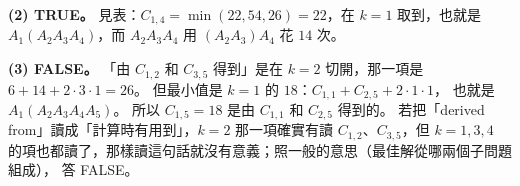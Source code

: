 \begin{pastsoln}
\textbf{(2) TRUE。} 見表：$C_{1,4} = \min(22, 54, 26) = 22$，在 $k = 1$ 取到，也就是
$A_1 (A_2 A_3 A_4)$，而 $A_2 A_3 A_4$ 用 $(A_2 A_3) A_4$ 花 $14$ 次。

\textbf{(3) FALSE。} 「由 $C_{1,2}$ 和 $C_{3,5}$ 得到」是在 $k = 2$ 切開，那一項是
$6 + 14 + 2 \cdot 3 \cdot 1 = 26$。 但最小值是 $k = 1$ 的 $18$：$C_{1,1} + C_{2,5} + 2 \cdot 1 \cdot 1$，
也就是 $A_1 (A_2 A_3 A_4 A_5)$。 所以 $C_{1,5} = 18$ 是由 $C_{1,1}$ 和 $C_{2,5}$ 得到的。
若把「derived from」讀成「計算時有用到」，$k = 2$ 那一項確實有讀 $C_{1,2}$、$C_{3,5}$，但
$k = 1, 3, 4$ 的項也都讀了，那樣讀這句話就沒有意義；照一般的意思（最佳解從哪兩個子問題組成），
答 FALSE。
\end{pastsoln}
